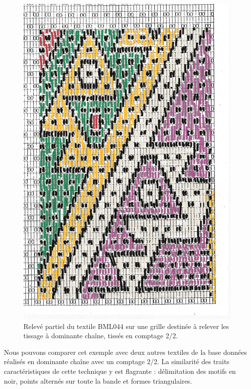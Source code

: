 \begin{figure}[!ht]
       \begin{center}
        		\includegraphics[width=14cm]{../images/BML044_schema.jpg}
	\end{center}
    \caption{Relevé partiel du textile BML044 sur une grille destinée à relever les tissage à dominante chaîne, tissés en comptage 2/2.}
    \label{fig:BML044_schema}
\end{figure}

Nous pouvons comparer cet exemple avec deux autres textiles de la base données réalisés en dominante chaîne avec un comptage 2/2. La similarité des traits caractéristiques de cette technique y est flagrante : délimitation des motifs en noir, points alternés sur toute la bande et formes triangulaires.

